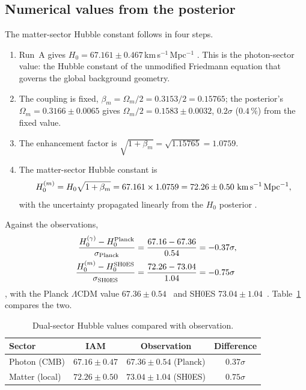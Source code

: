 \subsection{Numerical values from the posterior}
The matter-sector Hubble constant follows in four steps.
\begin{enumerate}
\item Run~A gives $H_0=67.161\pm0.467$\,km\,s$^{-1}$\,Mpc$^{-1}$ \measured. This is the photon-sector value: the Hubble constant of the unmodified
Friedmann equation that governs the global background geometry.
\item The coupling is fixed, $\beta_m=\Omega_m/2=0.3153/2=0.15765$; the posterior's $\Omega_m=0.3166\pm0.0065$ gives $\Omega_m/2=0.1583\pm0.0032$, $0.2\sigma$
($0.4\,\%$) from the fixed value.
\item The enhancement factor is $\sqrt{1+\beta_m}=\sqrt{1.15765}=1.0759$.
\item The matter-sector Hubble constant is
\begin{equation}
H_0^{(m)}=H_0\sqrt{1+\beta_m}=67.161\times1.0759=72.26\pm0.50\ {\rm km\,s^{-1}\,Mpc^{-1}},
\label{eq:l2_H0m}\end{equation}
with the uncertainty propagated linearly from the $H_0$ posterior \calc.
\end{enumerate}
Against the observations,
\begin{align}
\frac{H_0^{(\gamma)}-H_0^{\rm Planck}}{\sigma_{\rm Planck}}&=\frac{67.16-67.36}{0.54}=-0.37\sigma,\label{eq:l2_tension_planck}\\
\frac{H_0^{(m)}-H_0^{\rm SH0ES}}{\sigma_{\rm SH0ES}}&=\frac{72.26-73.04}{1.04}=-0.75\sigma\label{eq:l2_tension_shoes}
\end{align}
\calc, with the Planck $\Lambda$CDM value $67.36\pm0.54$~\cite{Planck2018VI} and SH0ES $73.04\pm1.04$~\cite{Riess2022}. Table~\ref{tab:l2_hubble} compares
the two.

\begin{table}[htbp]\centering\small
\caption{Dual-sector Hubble values compared with observation. \calc}\label{tab:l2_hubble}
\begin{tabular}{lccc}\hline
Sector & IAM & Observation & Difference\\\hline
Photon (CMB) & $67.16\pm0.47$ & $67.36\pm0.54$ (Planck) & $0.37\sigma$\\
Matter (local) & $72.26\pm0.50$ & $73.04\pm1.04$ (SH0ES) & $0.75\sigma$\\\hline
\end{tabular}\end{table}

